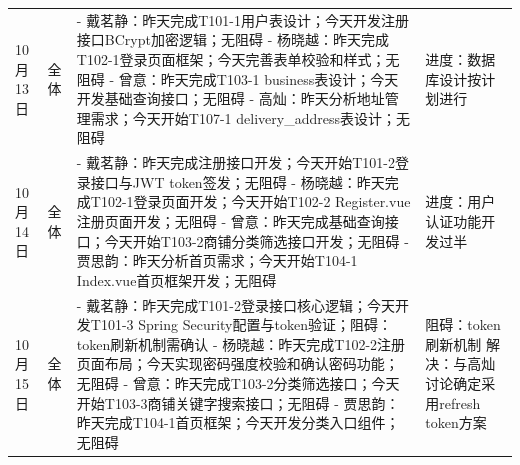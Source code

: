 \begin{levellist}
\begin{longtable}{>{\centering\arraybackslash}m{1cm} >{\centering\arraybackslash}m{1cm} >{\centering\arraybackslash}m{8.5cm} >{\centering\arraybackslash}m{3cm}}
        10月13日                                              & 全体                                                                               & - 戴茗静：昨天完成T101-1用户表设计；今天开发注册接口BCrypt加密逻辑；无阻碍 \newline
        - 杨晓越：昨天完成T102-1登录页面框架；今天完善表单校验和样式；无阻碍 \newline
        - 曾意：昨天完成T103-1 business表设计；今天开发基础查询接口；无阻碍 \newline
        - 高灿：昨天分析地址管理需求；今天开始T107-1 delivery\_address表设计；无阻碍 & 进度：数据库设计按计划进行                                                                                                                                                                              \\
        10月14日                                              & 全体                                                                               & - 戴茗静：昨天完成注册接口开发；今天开始T101-2登录接口与JWT token签发；无阻碍 \newline
        - 杨晓越：昨天完成T102-1登录页面开发；今天开始T102-2 Register.vue注册页面开发；无阻碍 \newline
        - 曾意：昨天完成基础查询接口；今天开始T103-2商铺分类筛选接口开发；无阻碍 \newline
        - 贾思韵：昨天分析首页需求；今天开始T104-1 Index.vue首页框架开发；无阻碍       & 进度：用户认证功能开发过半                                                                                                                                                                              \\
        10月15日                                              & 全体                                                                               & - 戴茗静：昨天完成T101-2登录接口核心逻辑；今天开发T101-3 Spring Security配置与token验证；阻碍：token刷新机制需确认 \newline
        - 杨晓越：昨天完成T102-2注册页面布局；今天实现密码强度校验和确认密码功能；无阻碍 \newline
        - 曾意：昨天完成T103-2分类筛选接口；今天开始T103-3商铺关键字搜索接口；无阻碍 \newline
        - 贾思韵：昨天完成T104-1首页框架；今天开发分类入口组件；无阻碍                 & 阻碍：token刷新机制 \newline
        解决：与高灿讨论确定采用refresh token方案                                                                                                                                                                                                                      \\

\end{longtable}
\end{levellist}
